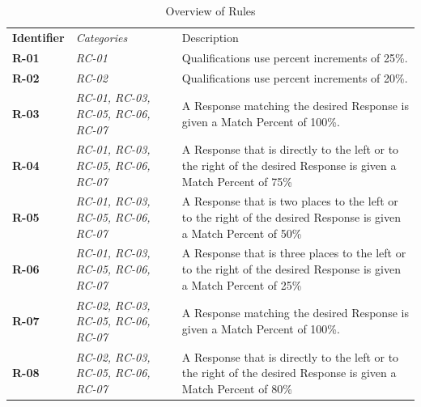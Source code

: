 \documentclass[12pt,letterpaper]{article}
\begin{document}
\begin{table}[H]
	\caption{Overview of Rules}
	\begin{tabu} to 
	    \tableheader{}Identifier & Categories & Description\\
		R-01 & RC-01 & Qualifications use percent increments of 25\%.\\
		R-02 & RC-02 & Qualifications use percent increments of 20\%.\\
		R-03 & RC-01, RC-03, RC-05, RC-06, RC-07 & A Response matching the desired Response is given a Match Percent of 100\%.\\
		R-04 & RC-01, RC-03, RC-05, RC-06, RC-07 & A Response that is directly to the left or to the right of the desired Response is given a Match Percent of 75\%\\
		R-05 & RC-01, RC-03, RC-05, RC-06, RC-07 & A Response that is two places to the left or to the right of the desired Response is given a Match Percent of 50\%\\
		R-06 & RC-01, RC-03, RC-05, RC-06, RC-07 & A Response that is three places to the left or to the right of the desired Response is given a Match Percent of 25\%\\
		R-07 & RC-02, RC-03, RC-05, RC-06, RC-07 & A Response matching the desired Response is given a Match Percent of 100\%.\\
		R-08 & RC-02, RC-03, RC-05, RC-06, RC-07 & A Response that is directly to the left or to the right of the desired Response is given a Match Percent of 80\%\\
	\end{tabu}
\end{table}
\end{document}
